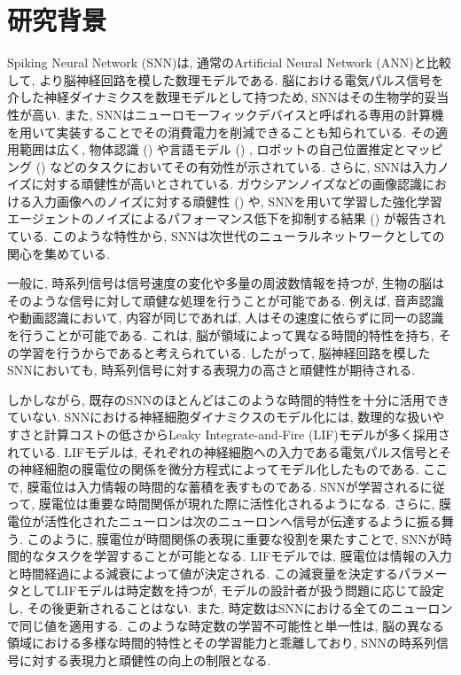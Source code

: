 \section{研究背景}
Spiking Neural Network (SNN)は, 通常のArtificial Neural Network (ANN)と比較して, より脳神経回路を模した数理モデルである.
脳における電気パルス信号を介した神経ダイナミクスを数理モデルとして持つため, SNNはその生物学的妥当性が高い\cite{taherkhani2020review}.
また, SNNはニューロモーフィックデバイスと呼ばれる専用の計算機を用いて実装することでその消費電力を削減できることも知られている\cite{balaji2019mapping}.
その適用範囲は広く, 物体認識 () や言語モデル () , ロボットの自己位置推定とマッピング () などのタスクにおいてその有効性が示されている\cite{yamazaki2022spiking, snnyolo, s23063037, spinnaker,snnslam}.
さらに, SNNは入力ノイズに対する頑健性が高いとされている.
ガウシアンノイズなどの画像認識における入力画像へのノイズに対する頑健性 () \cite{zhao2022spiking}や, SNNを用いて学習した強化学習エージェントのノイズによるパフォーマンス低下を抑制する結果 () が報告されている\cite{patel2019improved}.
このような特性から, SNNは次世代のニューラルネットワークとしての関心を集めている\cite{maass1997networks, wang2020supervised}.

一般に, 時系列信号は信号速度の変化や多量の周波数情報を持つが, 生物の脳はそのような信号に対して頑健な処理を行うことが可能である.
例えば, 音声認識や動画認識において, 内容が同じであれば, 人はその速度に依らずに同一の認識を行うことが可能である.
これは, 脳が領域によって異なる時間的特性を持ち, その学習を行うからであると考えられている\cite{mattia2002population, deco2019brain}.
したがって, 脳神経回路を模したSNNにおいても, 時系列信号に対する表現力の高さと頑健性が期待される\cite{dhsnn}.

しかしながら, 既存のSNNのほとんどはこのような時間的特性を十分に活用できていない\cite{dhsnn}.
SNNにおける神経細胞ダイナミクスのモデル化には, 数理的な扱いやすさと計算コストの低さからLeaky Integrate-and-Fire (LIF)モデルが多く採用されている.
LIFモデルは, それぞれの神経細胞への入力である電気パルス信号とその神経細胞の膜電位の関係を微分方程式によってモデル化したものである.
ここで, 膜電位は入力情報の時間的な蓄積を表すものである.
SNNが学習されるに従って, 膜電位は重要な時間関係が現れた際に活性化されるようになる.
さらに, 膜電位が活性化されたニューロンは次のニューロンへ信号が伝達するように振る舞う.
このように, 膜電位が時間関係の表現に重要な役割を果たすことで, SNNが時間的なタスクを学習することが可能となる.
LIFモデルでは, 膜電位は情報の入力と時間経過による減衰によって値が決定される.
この減衰量を決定するパラメータとしてLIFモデルは時定数を持つが, モデルの設計者が扱う問題に応じて設定し, その後更新されることはない.
また, 時定数はSNNにおける全てのニューロンで同じ値を適用する.
このような時定数の学習不可能性と単一性は, 脳の異なる領域における多様な時間的特性とその学習能力と乖離しており, SNNの時系列信号に対する表現力と頑健性の向上の制限となる.


